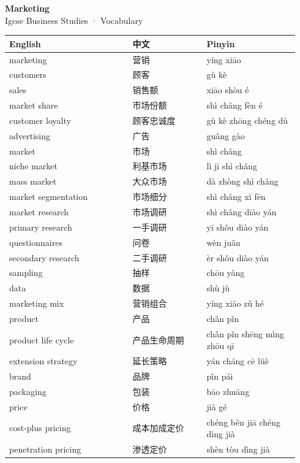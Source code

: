 \documentclass[11pt]{article}
\begin{document}
\begin{center}
  {\LARGE\bfseries Marketing}\\[0.35em]
  {\large Igcse Business Studies · Vocabulary}
\end{center}
\vspace{0.6em}

\begin{longtable}{@{}p{0.40\linewidth}p{0.24\linewidth}p{0.30\linewidth}@{}}
\toprule
\textbf{English} & \textbf{中文} & \textbf{Pinyin} \\
\midrule
\endhead
\bottomrule
\endlastfoot
marketing & 营销 & yíng xiāo \\
customers & 顾客 & gù kè \\
sales & 销售额 & xiāo shòu é \\
market share & 市场份额 & shì chǎng fèn é \\
customer loyalty & 顾客忠诚度 & gù kè zhōng chéng dù \\
advertising & 广告 & guǎng gào \\
market & 市场 & shì chǎng \\
niche market & 利基市场 & lì jī shì chǎng \\
mass market & 大众市场 & dà zhòng shì chǎng \\
market segmentation & 市场细分 & shì chǎng xì fēn \\
market research & 市场调研 & shì chǎng diào yán \\
primary research & 一手调研 & yī shǒu diào yán \\
questionnaires & 问卷 & wèn juǎn \\
secondary research & 二手调研 & èr shǒu diào yán \\
sampling & 抽样 & chōu yàng \\
data & 数据 & shù jù \\
marketing mix & 营销组合 & yíng xiāo zǔ hé \\
product & 产品 & chǎn pǐn \\
product life cycle & 产品生命周期 & chǎn pǐn shēng mìng zhōu qī \\
extension strategy & 延长策略 & yán cháng cè lüè \\
brand & 品牌 & pǐn pái \\
packaging & 包装 & bāo zhuāng \\
price & 价格 & jià gé \\
cost-plus pricing & 成本加成定价 & chéng běn jiā chéng dìng jià \\
penetration pricing & 渗透定价 & shèn tòu dìng jià \\

\end{longtable}
\end{document}
